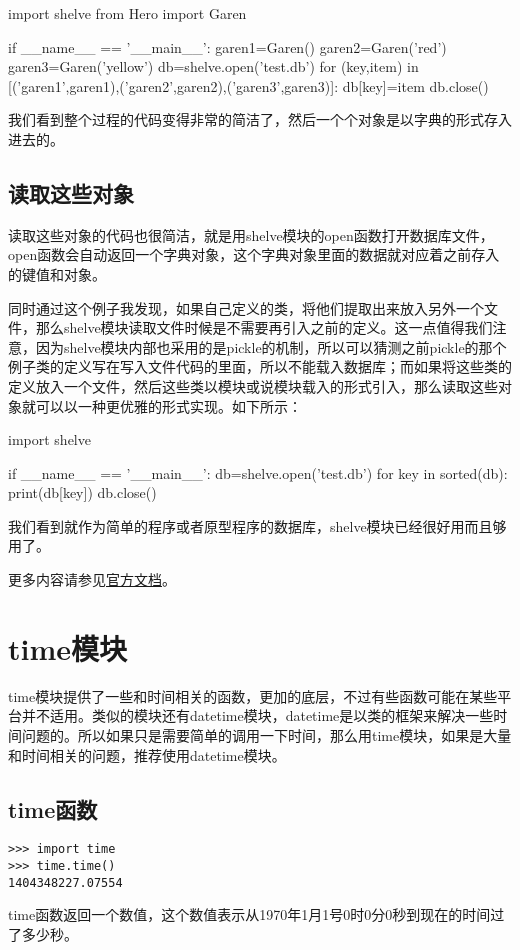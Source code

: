\documentclass[12pt,oneside]{book}
\begin{document}
\begin{common-format}
\begin{tcbpython}
import shelve
from Hero import Garen

if __name__ == '__main__':
    garen1=Garen()
    garen2=Garen('red')
    garen3=Garen('yellow')
    db=shelve.open('test.db')
    for (key,item) in [('garen1',garen1),('garen2',garen2),('garen3',garen3)]:
        db[key]=item
    db.close()
\end{tcbpython}

我们看到整个过程的代码变得非常的简洁了，然后一个个对象是以字典的形式存入进去的。

\section{读取这些对象}
读取这些对象的代码也很简洁，就是用shelve模块的open函数打开数据库文件，open函数会自动返回一个字典对象，这个字典对象里面的数据就对应着之前存入的键值和对象。

同时通过这个例子我发现，如果自己定义的类，将他们提取出来放入另外一个文件，那么shelve模块读取文件时候是不需要再引入之前的定义。这一点值得我们注意，因为shelve模块内部也采用的是pickle的机制，所以可以猜测之前pickle的那个例子类的定义写在写入文件代码的里面，所以不能载入数据库；而如果将这些类的定义放入一个文件，然后这些类以模块或说模块载入的形式引入，那么读取这些对象就可以以一种更优雅的形式实现。如下所示：
\begin{tcbpython}
import shelve

if __name__ == '__main__':
    db=shelve.open('test.db')
    for key in sorted(db):
        print(db[key])
    db.close()
\end{tcbpython}

我们看到就作为简单的程序或者原型程序的数据库，shelve模块已经很好用而且够用了。


\begin{large}
更多内容请参见\href{https://docs.python.org/3/library/shelve.html}{官方文档}。
\end{large}


\chapter{time模块}
time模块提供了一些和时间相关的函数，更加的底层，不过有些函数可能在某些平台并不适用。类似的模块还有datetime模块，datetime是以类的框架来解决一些时间问题的。所以如果只是需要简单的调用一下时间，那么用time模块，如果是大量和时间相关的问题，推荐使用datetime模块。

\section{time函数}
\begin{Verbatim}
>>> import time
>>> time.time()
1404348227.07554
\end{Verbatim}
time函数返回一个数值，这个数值表示从1970年1月1号0时0分0秒到现在的时间过了多少秒。


\end{common-format}
\end{document}
